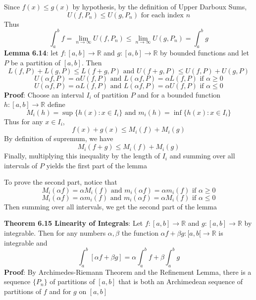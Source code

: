 \documentclass{article}
\begin{document}
    Since $f(x) \leq g(x)$ by hypothesis, by the definition of Upper Darboux Sums,
    \[U(f, P_n) \leq U(g, P_n) \text{ for each index } n\]
    Thus
    \[\int_a^b f = \lim_{n \rightarrow \infty}U(f, P_n) \leq \lim_{n \rightarrow \infty}U(g, P_n) = \int_a^b g\]
    \textbf{Lemma 6.14}: let $f \colon [a, b] \rightarrow \mathbb{R}$ and $g \colon [a, b] \rightarrow \mathbb{R}$ by bounded functions and let $P$ be a partition of $[a, b]$. Then
    \[L(f, P) + L(g, P) \leq L(f + g, P) \text{ and } U(f + g, P) \leq U(f, P) + U(g, P)\]
    \[U(\alpha f, P) = \alpha U(f, P) \text{ and } L(\alpha f, P) = \alpha L(f, P) \text{ if } \alpha \geq 0\]
    \[U(\alpha f, P) = \alpha L(f, P) \text{ and } L(\alpha f, P) = \alpha U(f, P) \text{ if } \alpha \leq 0\]
    \textbf{Proof}: Choose an interval $I_i$ of partition $P$ and for a bounded function $h \colon [a,b] \rightarrow \mathbb{R}$ define
    \[M_i(h) = \sup\{h(x) \colon x \in I_i\} \text{ and } m_i(h) = \inf\{h(x) \colon x \in I_i\}\]
    Thus for any $x \in I_i$,
    \[f(x) + g(x) \leq M_i(f) + M_i(g)\]
    By definition of supremum, we have
    \[M_i(f + g) \leq M_i(f) + M_i(g)\]
    Finally, multiplying this inequality by the length of $I_i$ and summing over all intervals of $P$ yields the first part of the lemma

    To prove the second part, notice that
    \[M_i(\alpha f) = \alpha M_i(f) \text{ and } m_i(\alpha f) = \alpha m_i(f) \text{ if } \alpha \geq 0\]
    \[M_i(\alpha f) = \alpha m_i(f) \text{ and } m_i(\alpha f) = \alpha M_i(f) \text{ if } \alpha \leq 0\]
    Then summing over all intervals, we get the second part of the lemma\bigskip

    \textbf{Theorem 6.15 Linearity of Integrals}: Let $f\colon [a, b] \rightarrow \mathbb{R}$ and $g \colon [a,b] \rightarrow \mathbb{R}$ by integrable. Then for any numbers $\alpha, \beta$ the function $\alpha f + \beta g \colon [a, b[ \rightarrow \mathbb{R}$ is integrable and
    \[\int_a^b[\alpha f + \beta g] = \alpha \int_a^b f + \beta \int_a^b g\]
    \textbf{Proof}: By Archimedes-Riemann Theorem and the Refinement Lemma, there is a sequence $\{P_n\}$ of partitions of $[a,b]$ that is both an Archimedean sequence of partitions of $f$ and for $g$ on $[a, b]$
\end{document}
